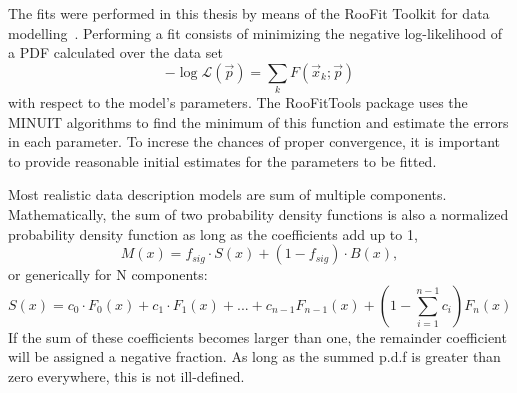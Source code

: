 The fits were performed in this thesis by means of the RooFit Toolkit for data modelling~\cite{RooFit}. Performing a fit consists of minimizing the negative log-likelihood of a PDF calculated over the data set %
%
\begin{equation}
-\log \mathcal{L} (\vec{p}) = \sum_k F(\vec{x}_k;\vec{p})
\end{equation}
%
with respect to the model's parameters.  The RooFitTools package uses the MINUIT\cite{MINUIT} algorithms to find the minimum of this function and estimate the errors in each parameter.  %
To increse the chances of proper convergence, it is important to provide reasonable initial estimates for the parameters to be fitted.



Most realistic data description models are sum of multiple components. Mathematically, the sum of two probability density functions is  also a normalized probability density function as  long as the coefficients add up to 1, %
%
\begin{equation}
M(x) = f_{sig} \cdot S(x) + (1-f_{sig}) \cdot B(x),
\end{equation}
%
or generically for N components:
%
\begin{equation}
S(x) = c_0 \cdot F_0(x) + c_1 \cdot F_1(x)+...+c_{n-1}F_{n-1}(x)+ (1-\sum^{n-1}_{i=1}c_i) F_n(x)
\end{equation}
%
If the sum of these coefficients becomes larger than one, the remainder coefficient will be assigned a negative fraction. As long as the summed p.d.f is greater than zero everywhere, this is not ill-defined. %




